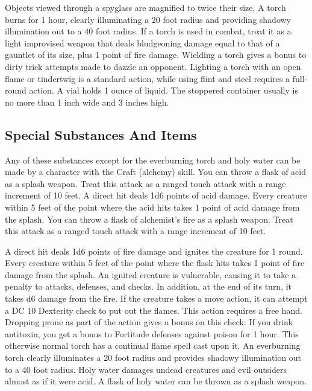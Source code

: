  Objects viewed through a spyglass are magnified to twice their size.
 A torch burns for 1 hour, clearly illuminating a 20 foot radius and providing shadowy illumination out to a 40 foot radius. If a torch is used in combat, treat it as a light improvised weapon that deals bludgeoning damage equal to that of a gauntlet of its size, plus 1 point of fire damage. Wielding a torch gives a  bonus to dirty trick attempts made to dazzle an opponent. Lighting a torch with an open flame or tindertwig is a standard action, while using flint and steel requires a full-round action.
 A vial holds 1 ounce of liquid. The stoppered container usually is no more than 1 inch wide and 3 inches high.

\subsection{Special Substances And Items}
Any of these substances except for the everburning torch and holy water can be made by a character with the Craft (alchemy) skill.
 You can throw a flask of acid as a splash weapon. Treat this attack as a ranged touch attack with a range increment of 10 feet. A direct hit deals 1d6 points of acid damage. Every creature within 5 feet of the point where the acid hits takes 1 point of acid damage from the splash.
 You can throw a flask of alchemist's fire as a splash weapon. Treat this attack as a ranged touch attack with a range increment of 10 feet.
\par A direct hit deals 1d6 points of fire damage and ignites the creature for 1 round. Every creature within 5 feet of the point where the flask hits takes 1 point of fire damage from the splash. An ignited creature is vulnerable, causing it to take a  penalty to attacks, defenses, and checks. In addition, at the end of its turn, it takes d6 damage from the fire. If the creature takes a move action, it can attempt a DC 10 Dexterity check to put out the flames. This action requires a free hand. Dropping prone as part of the action gives a  bonus on this check.
 If you drink antitoxin, you get a  bonus to Fortitude defenses against poison for 1 hour.
 This otherwise normal torch has a continual flame spell cast upon it. An everburning torch clearly illuminates a 20 foot radius and provides shadowy illumination out to a 40 foot radius.
 Holy water damages undead creatures and evil outsiders almost as if it were acid. A flask of holy water can be thrown as a splash weapon.
